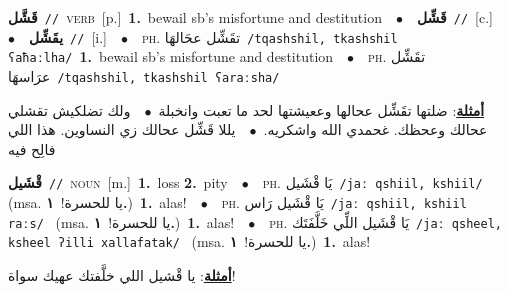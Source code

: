 \documentclass[10pt,a4paper,twoside]{article} %
\begin{document}
\begin{multicols}{2}
{\setlength\topsep{0pt}\textbf{\foreignlanguage{arabic}{قَشَّل}}\ {\color{gray}\texttt{//}\color{black}}\ \textsc{verb}\ [p.]\ \textbf{1.}~bewail sb's misfortune and destitution\ \ $\bullet$\ \ \setlength\topsep{0pt}\textbf{\foreignlanguage{arabic}{قَشِّل}}\ {\color{gray}\texttt{//}\color{black}}\ [c.]\ \ $\bullet$\ \ \setlength\topsep{0pt}\textbf{\foreignlanguage{arabic}{يقَشِّل}}\ {\color{gray}\texttt{//}\color{black}}\ [i.]\ \ $\bullet$\ \ \textsc{ph.} \color{gray} \foreignlanguage{arabic}{تقَشِّل عحَالهَا}\color{black}\ {\color{gray}\texttt{/{\sffamily tqashshil, tkashshil ʕaħaːlha}/}\color{black}}\ \textbf{1.}~bewail sb's misfortune and destitution\ \ $\bullet$\ \ \textsc{ph.} \color{gray} \foreignlanguage{arabic}{تقَشِّل عرَاسهَا}\color{black}\ {\color{gray}\texttt{/{\sffamily tqashshil, tkashshil ʕaraːsha}/}\color{black}}\  \begin{flushright}\color{gray}\foreignlanguage{arabic}{\textbf{\underline{\foreignlanguage{arabic}{أمثلة}}}: ضلتها تقَشِّل عحالها وععيشتها لحد ما تعبت وانخبلة\ $\bullet$\ \  ولك تضلكيش تقشلي عحالك وعحظك. غحمدي الله واشكريه.\ $\bullet$\ \  يللا قَشِّل عحالك زي النساوين. هذا اللي فالِح فيه}\end{flushright}\color{black}} \vspace{2mm}

{\setlength\topsep{0pt}\textbf{\foreignlanguage{arabic}{قْشَيل}}\ {\color{gray}\texttt{//}\color{black}}\ \textsc{noun}\ [m.]\ \textbf{1.}~loss  \textbf{2.}~pity\ \ $\bullet$\ \ \textsc{ph.} \color{gray} \foreignlanguage{arabic}{يَا قْشَيل}\color{black}\ {\color{gray}\texttt{/{\sffamily jaː qshiil, kshiil}/}\color{black}}\ \color{gray} (msa. \foreignlanguage{arabic}{يا للحسرة!}~\foreignlanguage{arabic}{\textbf{١.}})\color{black}\ \textbf{1.}~alas!\ \ $\bullet$\ \ \textsc{ph.} \color{gray} \foreignlanguage{arabic}{يَا قْشَيل رَاس}\color{black}\ {\color{gray}\texttt{/{\sffamily jaː qshiil, kshiil raːs}/}\color{black}}\ \color{gray} (msa. \foreignlanguage{arabic}{يا للحسرة!}~\foreignlanguage{arabic}{\textbf{١.}})\color{black}\ \textbf{1.}~alas!\ \ $\bullet$\ \ \textsc{ph.} \color{gray} \foreignlanguage{arabic}{يَا قْشَيل اللِّي خَلَّفَتَك}\color{black}\ {\color{gray}\texttt{/{\sffamily jaː qsheel, ksheel ʔilli xallafatak}/}\color{black}}\ \color{gray} (msa. \foreignlanguage{arabic}{يا للحسرة!}~\foreignlanguage{arabic}{\textbf{١.}})\color{black}\ \textbf{1.}~alas!\  \begin{flushright}\color{gray}\foreignlanguage{arabic}{\textbf{\underline{\foreignlanguage{arabic}{أمثلة}}}: يا قْشيل اللي خلَّفتك عهيك سواة!}\end{flushright}\color{black}} \vspace{2mm}


\end{multicols}
\end{document}
